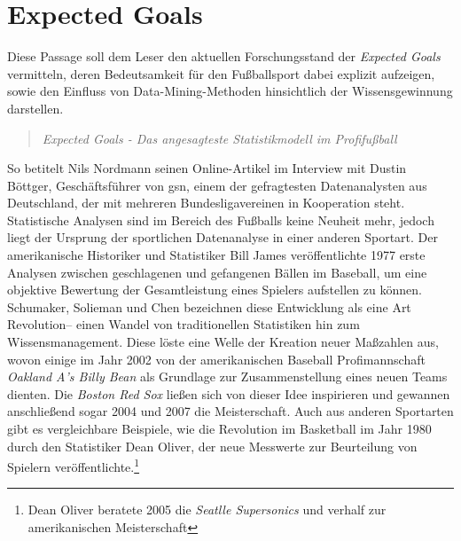 \section{Expected Goals}
Diese Passage soll dem Leser den aktuellen Forschungsstand der \textit{Expected Goals} vermitteln, deren Bedeutsamkeit für den Fußballsport dabei explizit aufzeigen, sowie den Einfluss von Data-Mining-Methoden hinsichtlich der Wissensgewinnung darstellen.

\begin{quote}
\textit{\glqq Expected Goals - Das angesagteste Statistikmodell im Profifußball\grqq}
\end{quote}

So betitelt Nils Nordmann seinen Online-Artikel im Interview mit Dustin Böttger, Geschäftsführer von \gls{gsn}, einem der gefragtesten Datenanalysten aus Deutschland, der mit mehreren Bundesligavereinen in Kooperation steht. Statistische Analysen sind im Bereich des Fußballs keine Neuheit mehr, jedoch liegt der Ursprung der sportlichen Datenanalyse in einer anderen Sportart. Der amerikanische Historiker und Statistiker Bill James veröffentlichte 1977 erste Analysen zwischen geschlagenen und gefangenen Bällen im Baseball, um eine objektive Bewertung der Gesamtleistung eines Spielers aufstellen zu können. Schumaker, Solieman und Chen bezeichnen diese Entwicklung als eine Art \glqq Revolution\grqq-- einen Wandel von traditionellen Statistiken hin zum Wissensmanagement. Diese löste eine Welle der Kreation neuer Maßzahlen aus, wovon einige im Jahr 2002 von der amerikanischen Baseball Profimannschaft \textit{Oakland A’s Billy Bean} als Grundlage zur Zusammenstellung eines neuen Teams dienten. Die \textit{Boston Red Sox} ließen sich von dieser Idee inspirieren und  gewannen anschließend sogar 2004 und 2007 die Meisterschaft. Auch aus anderen Sportarten gibt es vergleichbare Beispiele, wie die Revolution im Basketball im Jahr 1980 durch den Statistiker Dean Oliver, der neue Messwerte zur Beurteilung von Spielern veröffentlichte.\footnote{Dean Oliver beratete 2005 die \textit{Seatlle Supersonics} und verhalf zur amerikanischen Meisterschaft}

